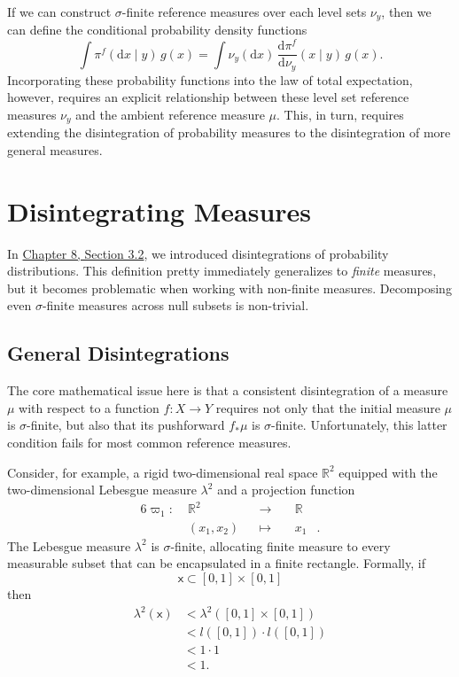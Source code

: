 \documentclass[
  letterpaper,
  DIV=11,
  numbers=noendperiod]{scrartcl}
\begin{document}
If we can construct \(\sigma\)-finite reference measures over each level
sets \(\nu_{y}\), then we can define the conditional probability density
functions \[
\int \pi^{f}( \mathrm{d} x \mid y ) \, g(x)
=
\int \nu_{y}( \mathrm{d} x ) \,
\frac{ \mathrm{d}  \pi^{f} }{ \mathrm{d}  \nu_{y}  } (x \mid y) \, g(x).
\] Incorporating these probability functions into the law of total
expectation, however, requires an explicit relationship between these
level set reference measures \(\nu_{y}\) and the ambient reference
measure \(\mu\). This, in turn, requires extending the disintegration of
probability measures to the disintegration of more general measures.

\section{Disintegrating Measures}\label{disintegrating-measures}

In
\href{http://www.symplectomorphic.com/assets/chapters_html/conditional_probability_theory.html\#sec:general-conditional}{Chapter
8, Section 3.2}, we introduced disintegrations of probability
distributions. This definition pretty immediately generalizes to
\emph{finite} measures, but it becomes problematic when working with
non-finite measures. Decomposing even \(\sigma\)-finite measures across
null subsets is non-trivial.

\subsection{General Disintegrations}\label{general-disintegrations}

The core mathematical issue here is that a consistent disintegration of
a measure \(\mu\) with respect to a function \(f : X \rightarrow Y\)
requires not only that the initial measure \(\mu\) is \(\sigma\)-finite,
but also that its pushforward \(f_{*} \mu\) is \(\sigma\)-finite.
Unfortunately, this latter condition fails for most common reference
measures.

Consider, for example, a rigid two-dimensional real space
\(\mathbb{R}^{2}\) equipped with the two-dimensional Lebesgue measure
\(\lambda^{2}\) and a projection function \begin{alignat*}{6}
\varpi_{1} :\; &\mathbb{R}^{2}& &\rightarrow& \; &\mathbb{R}&
\\
&(x_{1}, x_{2})& &\mapsto& &x_{1}&.
\end{alignat*} The Lebesgue measure \(\lambda^{2}\) is
\(\sigma\)-finite, allocating finite measure to every measurable subset
that can be encapsulated in a finite rectangle. Formally, if \[
\mathsf{x} \subset [0, 1] \times [0, 1]
\] then \begin{align*}
\lambda^{2}(\mathsf{x})
&<
\lambda^{2}( [0, 1] \times [0, 1] )
\\
&<
l([0, 1]) \cdot l([0, 1])
\\
&<
1 \cdot 1
\\
&<
1.
\end{align*}
\end{document}
